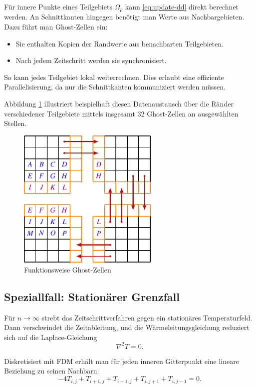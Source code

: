 Für innere Punkte eines Teilgebiets $\Omega_p$ kann \eqref{eq:update-dd} direkt berechnet werden.  
An Schnittkanten hingegen benötigt man Werte aus Nachbargebieten.  
Dazu führt man Ghost-Zellen ein:
\begin{itemize}
	\item Sie enthalten Kopien der Randwerte aus benachbarten Teilgebieten.
	\item Nach jedem Zeitschritt werden sie synchronisiert.
\end{itemize}
So kann jedes Teilgebiet lokal weiterrechnen. Dies erlaubt eine effiziente Parallelisierung, da nur die Schnittkanten kommuniziert werden müssen.

Abbildung \ref{parallelisierung:fig:ghostCells} illustriert beispielhaft diesen Datenaustausch über die Ränder verschiedener Teilgebiete mittels insgesamt 32 Ghost-Zellen an ausgewählten Stellen.

\begin{figure}[htbp]
	\centering
	\includegraphics[width=0.6\textwidth]{papers/parallelisierung/images/ghostCells.pdf}
	\caption{Funktionsweise Ghost-Zellen}
	\label{parallelisierung:fig:ghostCells}
\end{figure}



\subsection{Speziallfall: Stationärer Grenzfall}
Für $n \to \infty$ strebt das Zeitschrittverfahren gegen ein stationäres Temperaturfeld. 
Dann verschwindet die Zeitableitung, und die Wärmeleitungsgleichung reduziert sich auf die Laplace-Gleichung
\[
\nabla^2 T = 0.
\]

Diskretisiert mit FDM erhält man für jeden inneren Gitterpunkt eine lineare Beziehung zu seinen Nachbarn:
\[
-4T_{i,j} + T_{i+1,j} + T_{i-1,j} + T_{i,j+1} + T_{i,j-1} = 0.
\]

